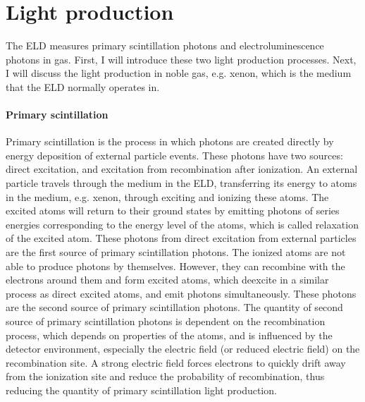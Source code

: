 \section{Light production}
\label{sec:gtest light procduction}
The ELD measures primary scintillation photons and electroluminescence photons in gas. First, I will introduce these two light production processes. Next, I will discuss the light production in noble gas, e.g. xenon, which is the medium that the ELD normally operates in. 

\paragraph{Primary scintillation} Primary scintillation is the process in which photons are created directly by energy deposition of external particle events. These photons have two sources: direct excitation, and excitation from recombination after ionization. An external particle travels through the medium in the ELD, transferring its energy to atoms in the medium, e.g. xenon, through exciting and ionizing these atoms. The excited atoms will return to their ground states by emitting photons of series energies corresponding to the energy level of the atoms, which is called relaxation of the excited atom. These photons from direct excitation from external particles are the first source of primary scintillation photons. The ionized atoms are not able to produce photons by themselves. However, they can recombine with the electrons around them and form excited atoms, which deexcite in a similar process as direct excited atoms, and emit photons simultaneously. These photons are the second source of primary scintillation photons. The quantity of second source of primary scintillation photons is dependent on the recombination process, which depends on properties of the atoms, and is influenced by the detector environment, especially the electric field (or reduced electric field) on the recombination site. A strong electric field forces electrons to quickly drift away from the ionization site and reduce the probability of recombination, thus reducing the quantity of primary scintillation light production. 

